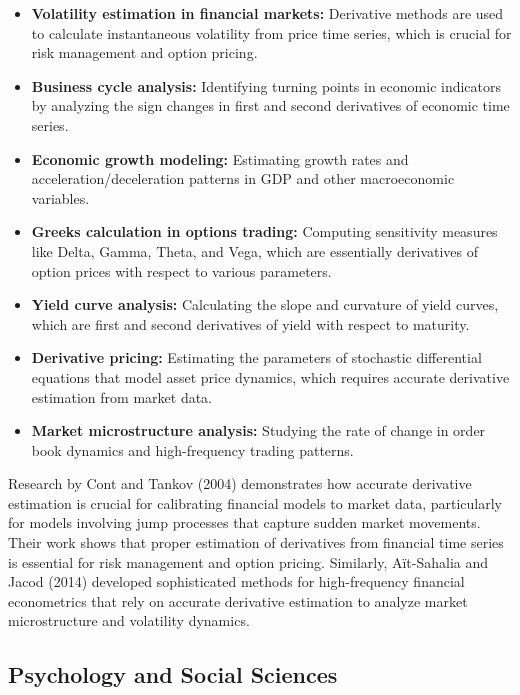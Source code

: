 \documentclass{article}
\begin{document}
\begin{itemize}
    \item \textbf{Volatility estimation in financial markets:} Derivative methods are used to calculate instantaneous volatility from price time series, which is crucial for risk management and option pricing.
    
    \item \textbf{Business cycle analysis:} Identifying turning points in economic indicators by analyzing the sign changes in first and second derivatives of economic time series.
    
    \item \textbf{Economic growth modeling:} Estimating growth rates and acceleration/deceleration patterns in GDP and other macroeconomic variables.
    
    \item \textbf{Greeks calculation in options trading:} Computing sensitivity measures like Delta, Gamma, Theta, and Vega, which are essentially derivatives of option prices with respect to various parameters.
    
    \item \textbf{Yield curve analysis:} Calculating the slope and curvature of yield curves, which are first and second derivatives of yield with respect to maturity.
    
    \item \textbf{Derivative pricing:} Estimating the parameters of stochastic differential equations that model asset price dynamics, which requires accurate derivative estimation from market data.
    
    \item \textbf{Market microstructure analysis:} Studying the rate of change in order book dynamics and high-frequency trading patterns.
\end{itemize}

Research by Cont and Tankov (2004) demonstrates how accurate derivative estimation is crucial for calibrating financial models to market data, particularly for models involving jump processes that capture sudden market movements. Their work shows that proper estimation of derivatives from financial time series is essential for risk management and option pricing. Similarly, A\"it-Sahalia and Jacod (2014) developed sophisticated methods for high-frequency financial econometrics that rely on accurate derivative estimation to analyze market microstructure and volatility dynamics.

\subsection{Psychology and Social Sciences}
\end{document}
